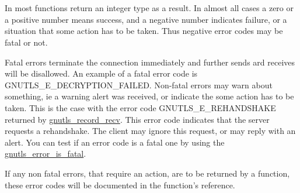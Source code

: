 \section{}
\par
In \gnutls{} most functions return an integer type as a result.
In almost all cases a zero or a positive number means success, and
a negative number indicates failure, or a situation that some
action has to be taken. Thus negative error codes may be fatal
or not. 
\par 
Fatal errors terminate the connection immediately and
further sends ard receives will be disallowed. An example of
a fatal error code is GNUTLS\_E\_DECRYPTION\_FAILED. Non-fatal errors
may warn about something, ie a warning alert was received, or
indicate the some action has to be taken. This is the case with
the error code GNUTLS\_E\_REHANDSHAKE returned by 
\hyperref{gnutls\_record\_recv()}{gnutls\_record\_recv() (see Section }{)}{gnutls_record_recv}.
This error code indicates that the server requests a rehandshake. The client
may ignore this request, or may reply with an alert.
You can test if an error code is a fatal one by using the
\hyperref{gnutls\_error\_is\_fatal()}{gnutls\_error\_is\_fatal() (see Section }{)}{gnutls_error_is_fatal}.
\par
If any non fatal errors, that require an action, are to be returned by a
function, these error codes will be documented
in the function's reference.


